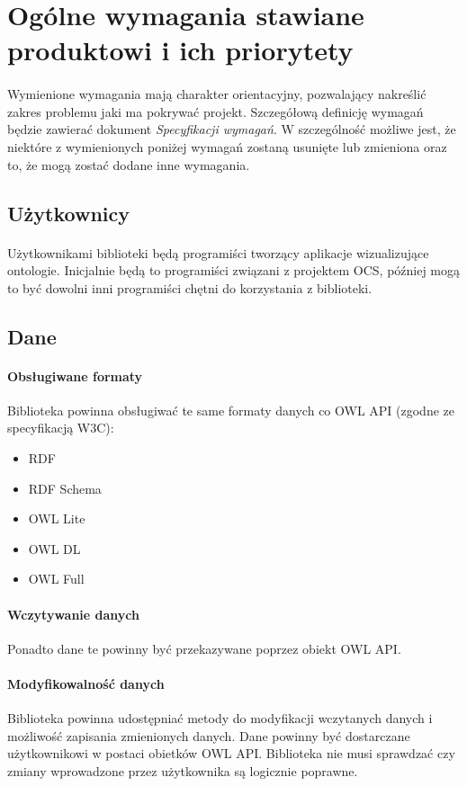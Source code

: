 \documentclass[a4paper,10pt]{article}
\begin{document}
\section{Ogólne wymagania stawiane produktowi i ich priorytety}
\paragraph{} Wymienione wymagania mają charakter orientacyjny, pozwalający nakreślić zakres problemu jaki ma pokrywać projekt. Szczegółową definicję wymagań będzie zawierać dokument \textit{Specyfikacji wymagań}. W szczególność możliwe jest, że niektóre z wymienionych poniżej wymagań zostaną usunięte lub zmieniona oraz to, że mogą zostać dodane inne wymagania.  

\subsection{Użytkownicy}
\paragraph{} Użytkownikami biblioteki będą programiści tworzący aplikacje wizualizujące ontologie. Inicjalnie będą to programiści związani z projektem OCS, później mogą to być dowolni inni programiści chętni do korzystania z biblioteki.  
\subsection{Dane}
\paragraph{Obsługiwane formaty} Biblioteka powinna obsługiwać te same formaty danych co OWL API (zgodne ze specyfikacją W3C):
\begin{itemize}
 	\item RDF
	\item RDF Schema
	\item OWL Lite
	\item OWL DL
	\item OWL Full
\end{itemize}

\paragraph{Wczytywanie danych}Ponadto dane te powinny być przekazywane poprzez obiekt OWL API.

\paragraph{Modyfikowalność danych} Biblioteka powinna udostępniać metody do modyfikacji wczytanych danych i możliwość zapisania zmienionych danych. Dane powinny być dostarczane użytkownikowi w postaci obietków OWL API. Biblioteka nie musi sprawdzać czy zmiany wprowadzone przez użytkownika są logicznie poprawne.   
\end{document}

